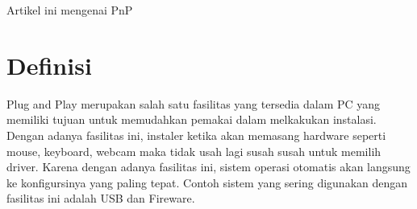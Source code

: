 ﻿%

Artikel ini mengenai PnP

\section{Definisi}
Plug and Play merupakan salah satu fasilitas yang tersedia dalam PC yang memiliki tujuan untuk memudahkan pemakai dalam melkakukan instalasi. Dengan adanya fasilitas ini, instaler ketika akan memasang hardware seperti mouse, keyboard, webcam maka tidak usah lagi susah susah untuk memilih driver. Karena dengan adanya fasilitas ini, sistem operasi otomatis akan langsung ke konfigursinya yang paling tepat. Contoh sistem yang sering digunakan dengan fasilitas ini adalah USB dan Fireware. 


